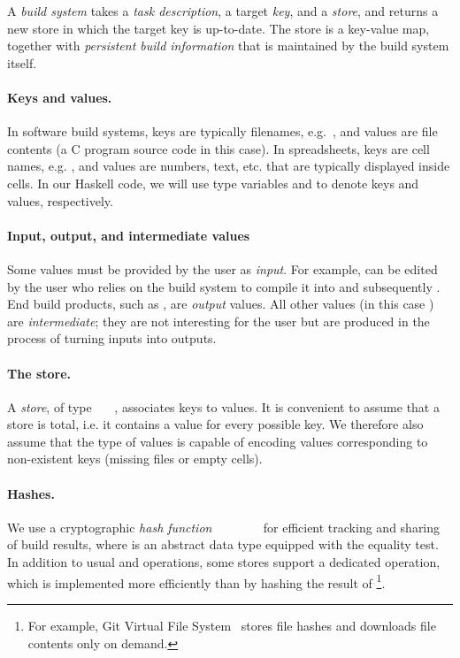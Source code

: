 A \emph{build system} takes a \emph{task description}, a target \emph{key},
and a \emph{store}, and returns a new store in which the target key is
up-to-date. The store is a key-value map, together with \emph{persistent build
information} that is maintained by the build system itself.

\paragraph{Keys and values.} In software build systems, keys are typically filenames,
e.g.~, and values are file contents (a C program source
code in this case). In spreadsheets, keys are cell names,
e.g. , and values are numbers, text, etc. that are typically
displayed inside cells. In our Haskell code, we will use type
variables  and  to denote keys and values, respectively.

\paragraph{Input, output, and intermediate values}
Some values must be provided by the user as \emph{input}. For example,
 can be edited by the user who relies on the build system to
compile it into  and subsequently . End build products,
such as , are \emph{output} values. All other values (in this case
) are \emph{intermediate}; they are not interesting for the user
but are produced in the process of turning inputs into outputs.

\paragraph{The store.}
A \emph{store}, of type ~~~, associates keys to
values. It is convenient to assume that a store is total, i.e. it contains a
value for every possible key. We therefore also assume that the type of values
is capable of encoding values corresponding to non-existent keys (missing files
or empty cells).

\paragraph{Hashes.}
We use a cryptographic \emph{hash function}
~\hs{::}~~~\hs{=>}~~\hs{->}~ for
efficient tracking and sharing of build results, where  is an abstract
data type equipped with the equality test.
In addition to usual  and  operations,
some stores support a dedicated  operation, which is implemented
more efficiently than by hashing the result of \footnote{For
example, Git Virtual File System~\cite{gvfs} stores file hashes and downloads
file contents only on demand.}.

